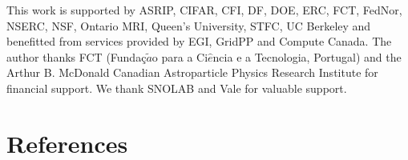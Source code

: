 \documentclass[a4paper]{jpconf}
\begin{document}
\ack{}

This work is supported by ASRIP, CIFAR, CFI, DF, DOE, ERC, FCT, FedNor, NSERC, NSF, Ontario MRI, Queen's University, STFC, UC Berkeley and benefitted from services provided by EGI, GridPP and Compute Canada. The author thanks FCT (Funda\c{c}$\tilde{a}$o para a Ci$\hat{e}$ncia e a Tecnologia, Portugal) and the Arthur B. McDonald Canadian Astroparticle Physics Research Institute for financial support. We thank SNOLAB and Vale for valuable support.

\section*{References}


\end{document}
